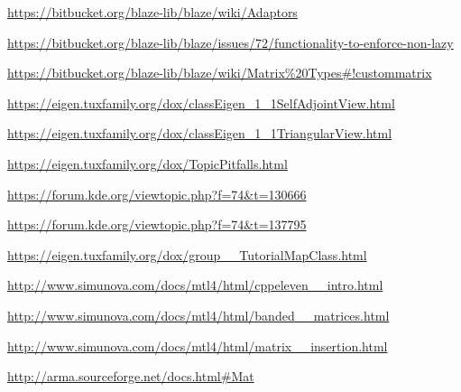 \documentclass{article}
\begin{document}
\begin{thebibliography}{9}

\url{https://bitbucket.org/blaze-lib/blaze/wiki/Adaptors}

\url{https://bitbucket.org/blaze-lib/blaze/issues/72/functionality-to-enforce-non-lazy}

\url{https://bitbucket.org/blaze-lib/blaze/wiki/Matrix%20Types#!custommatrix}

\url{https://eigen.tuxfamily.org/dox/classEigen_1_1SelfAdjointView.html}

\url{https://eigen.tuxfamily.org/dox/classEigen_1_1TriangularView.html}

\url{https://eigen.tuxfamily.org/dox/TopicPitfalls.html}

\url{https://forum.kde.org/viewtopic.php?f=74&t=130666}

\url{https://forum.kde.org/viewtopic.php?f=74&t=137795}

\url{https://eigen.tuxfamily.org/dox/group__TutorialMapClass.html}

\url{http://www.simunova.com/docs/mtl4/html/cppeleven__intro.html}

\url{http://www.simunova.com/docs/mtl4/html/banded__matrices.html}

\url{http://www.simunova.com/docs/mtl4/html/matrix__insertion.html}

\url{http://arma.sourceforge.net/docs.html#Mat}

\end{thebibliography}
\end{document}
